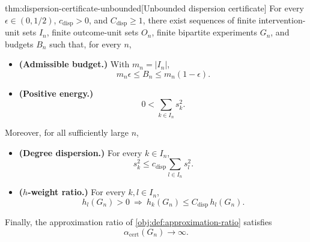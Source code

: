 \begin{theoremv}{thm:dispersion-certificate-unbounded}[Unbounded dispersion certificate]
For every $\epsilon\in(0,1/2)$, $c_{\mathrm{disp}}>0$, and $C_{\mathrm{disp}}\geq 1$, there exist sequences of finite intervention-unit sets $I_n$, finite outcome-unit sets $O_n$, finite bipartite experiments $G_n$, and budgets $B_n$ such that, for every $n$,

\begin{itemize}

\item \textbf{(Admissible budget.)} With $m_n=|I_n|$,
\[
m_n\epsilon\leq B_n\leq m_n(1-\epsilon).
\]

\item \textbf{(Positive energy.)}
\[
0<\sum_{k\in I_n}s_k^2.
\]

\end{itemize}

Moreover, for all sufficiently large $n$,

\begin{itemize}

\item \textbf{(Degree dispersion.)} For every $k\in I_n$,
\[
s_k^2\leq c_{\mathrm{disp}}\sum_{l\in I_n}s_l^2.
\]

\item \textbf{($h$-weight ratio.)} For every $k,l\in I_n$,
\[
h_l(G_n)>0\ \Longrightarrow\ h_k(G_n)\leq C_{\mathrm{disp}}\,h_l(G_n).
\]

\end{itemize}

Finally, the approximation ratio of \cref{obj:def:approximation-ratio} satisfies
\[
\alpha_{\mathrm{cert}}(G_n)\longrightarrow\infty .
\]
\end{theoremv}

